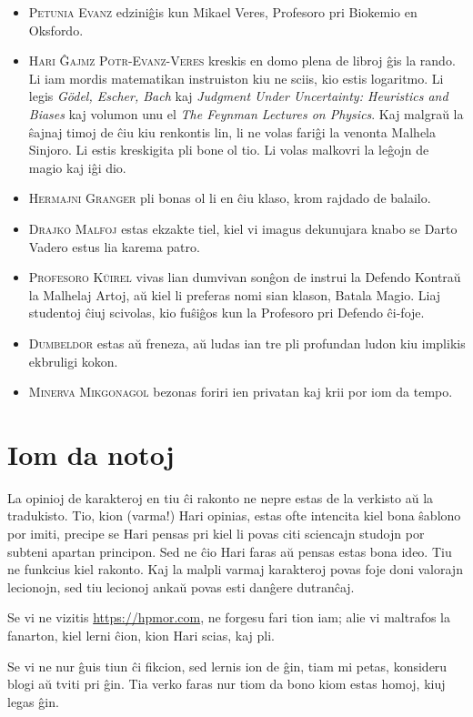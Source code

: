 \begin{itemize}
\item \textsc{Petunia Evanz} edziniĝis kun Mikael Veres, Profesoro pri Biokemio en Oksfordo.
\item \textsc{Hari Ĝajmz Potr-Evanz-Veres} kreskis en domo plena de libroj ĝis la rando. Li iam mordis matematikan instruiston kiu ne sciis, kio estis logaritmo. Li legis \emph{Gödel, Escher, Bach} kaj \emph{Judgment Under Uncertainty: Heuristics and Biases} kaj volumon unu el \emph{The Feynman Lectures on Physics}. Kaj malgraŭ la ŝajnaj timoj de ĉiu kiu renkontis lin, li ne volas fariĝi la venonta Malhela Sinjoro. Li estis kreskigita pli bone ol tio. Li volas malkovri la leĝojn de magio kaj iĝi dio.
\item \textsc{Hermajni Granger} pli bonas ol li en ĉiu klaso, krom rajdado de balailo.
\item \textsc{Drajko Malfoj} estas ekzakte tiel, kiel vi imagus dekunujara knabo se Darto Vadero estus lia karema patro.
\item \textsc{Profesoro Kŭirel} vivas lian dumvivan sonĝon de instrui la Defendo Kontraŭ la Malhelaj Artoj, aŭ kiel li preferas nomi sian klason, Batala Magio. Liaj studentoj ĉiuj scivolas, kio fuŝiĝos kun la Profesoro pri Defendo ĉi-foje.
\item \textsc{Dumbeldor} estas aŭ freneza, aŭ ludas ian tre pli profundan ludon kiu implikis ekbruligi kokon.
\item \textsc{Minerva Mikgonagol} bezonas foriri ien privatan kaj krii por iom da tempo.
\end{itemize}

%
%

\section*{Iom da notoj}
La opinioj de karakteroj en tiu ĉi rakonto ne nepre estas de la verkisto aŭ la tradukisto. Tio, kion (varma!) Hari opinias, estas ofte intencita kiel bona ŝablono por imiti, precipe se Hari pensas pri kiel li povas citi sciencajn studojn por subteni apartan principon. Sed ne ĉio Hari faras aŭ pensas estas bona ideo. Tiu ne funkcius kiel rakonto. Kaj la malpli varmaj karakteroj povas foje doni valorajn lecionojn, sed tiu lecionoj ankaŭ povas esti danĝere dutranĉaj.

Se vi ne vizitis \url{https://hpmor.com}, ne forgesu fari tion iam; alie vi maltrafos la fanarton, kiel lerni ĉion, kion Hari scias, kaj pli.

Se vi ne nur ĝuis tiun ĉi fikcion, sed lernis ion de ĝin, tiam mi petas, konsideru blogi aŭ tviti pri ĝin. Tia verko faras nur tiom da bono kiom estas homoj, kiuj legas ĝin.

